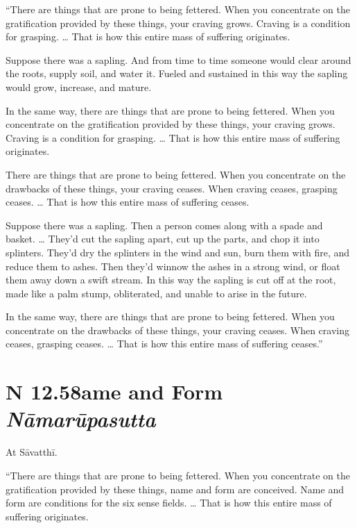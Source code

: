 \documentclass[12pt,openany]{book}%
\newcommand*{\suttatitleacronym}[1]{\smaller[2]{#1}\vspace*{.3em}}
\newcommand*{\suttatitletranslation}[1]{\linebreak{#1}}
\newcommand*{\suttatitleroot}[1]{\linebreak\smaller[2]\itshape{#1}}
\newcommand*{\tocacronym}[1]{\hspace*{-3.3em}{#1}\quad}
\newcommand*{\toctranslation}[1]{#1}
\newcommand*{\tocroot}[1]{(\textit{#1})}
\begin{document}
“There are things that are prone to being fettered. When you concentrate on the gratification provided by these things, your craving grows. Craving is a condition for grasping. … That is how this entire mass of suffering originates. 

Suppose there was a sapling. And from time to time someone would clear around the roots, supply soil, and water it. Fueled and sustained in this way the sapling would grow, increase, and mature. 

In the same way, there are things that are prone to being fettered. When you concentrate on the gratification provided by these things, your craving grows. Craving is a condition for grasping. … That is how this entire mass of suffering originates. 

There are things that are prone to being fettered. When you concentrate on the drawbacks of these things, your craving ceases. When craving ceases, grasping ceases. … That is how this entire mass of suffering ceases. 

Suppose there was a sapling. Then a person comes along with a spade and basket. … They’d cut the sapling apart, cut up the parts, and chop it into splinters. They’d dry the splinters in the wind and sun, burn them with fire, and reduce them to ashes. Then they’d winnow the ashes in a strong wind, or float them away down a swift stream. In this way the sapling is cut off at the root, made like a palm stump, obliterated, and unable to arise in the future. 

In the same way, there are things that are prone to being fettered. When you concentrate on the drawbacks of these things, your craving ceases. When craving ceases, grasping ceases. … That is how this entire mass of suffering ceases.” 

%
\section*{{\suttatitleacronym SN 12.58}{\suttatitletranslation Name and Form }{\suttatitleroot Nāmarūpasutta}}
\addcontentsline{toc}{section}{\tocacronym{SN 12.58} \toctranslation{Name and Form } \tocroot{Nāmarūpasutta}}

At \textsanskrit{Sāvatthī}. 

“There are things that are prone to being fettered. When you concentrate on the gratification provided by these things, name and form are conceived. Name and form are conditions for the six sense fields. … That is how this entire mass of suffering originates. 
\end{document}
